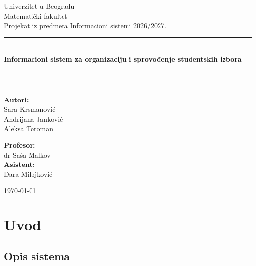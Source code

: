 \documentclass[12pt,a4paper]{article}
\begin{document}

\begin{titlepage}
    \centering
    {\Large Univerzitet u Beogradu}\\[0.3cm]
    {\Large Matematički fakultet}\\[1.5cm]
    {\large Projekat iz predmeta Informacioni sistemi 2026/2027.}\\[0.5cm]

    \rule{\linewidth}{0.5mm}\\[0.4cm]
    {\huge \bfseries Informacioni sistem za organizaciju i sprovođenje studentskih izbora}\\[0.4cm]
    \rule{\linewidth}{0.5mm}\\[3cm]

    \noindent
    \begin{minipage}{0.45\textwidth}
        \begin{flushleft}\large
            \textbf{Autori:}\\
            Sara Krsmanović\\
            Andrijana Janković\\
            Aleksa Toroman
        \end{flushleft}
    \end{minipage}%
    \hfill
    \begin{minipage}{0.45\textwidth}
        \begin{flushright}\large
            \textbf{Profesor:}\\
            dr Saša Malkov\\[0.5cm]
            \textbf{Asistent:}\\
            Dara Milojković
        \end{flushright}
    \end{minipage}

    \vfill
    {\large \today}
\end{titlepage}

\tableofcontents
\newpage

\section{Uvod}

\subsection{Opis sistema}
\end{document}
